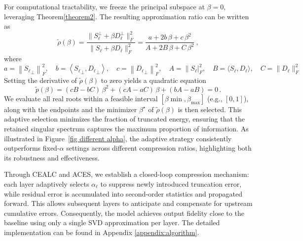 For computational tractability, we freeze the principal subspace at $\beta=0$, leveraging Theorem\ref{theorem2}. The resulting approximation ratio can be written as
\begin{equation}
    \widetilde\rho(\beta) = \frac{\|S_\ell^\perp + \beta D_\ell^\perp\|_F^2}{\|S_\ell + \beta D_\ell\|_F^2} = \frac{a + 2b\,\beta + c\,\beta^2}{A + 2B\,\beta + C\,\beta^2}~,
\end{equation}
where
\begin{equation}
a=\left\|{S_\ell}_{\perp}\right\|_F^2, \quad b=\left\langle {S_\ell}_{\perp}, {D_\ell}_{\perp}\right\rangle, \quad c=\left\|{D_\ell}_{\perp}\right\|_F^2, \quad A=\|{S_\ell}|_F^2, \quad B=\langle {S_\ell}, {D_\ell}\rangle, \quad C=\|{D_\ell}\|_F^2
\end{equation}
Setting the derivative of $\widetilde\rho(\beta)$ to zero yields a quadratic equation
\begin{equation}
    \widetilde{p}(\beta) = (cB - bC)\,\beta^2 + (cA - aC)\,\beta + (bA - aB) = 0\,.
    \label{eq: beta compute}
\end{equation}
We evaluate all real roots within a feasible interval $[\beta{\min},\beta_{\max}]$ (e.g., $[0,1]$), along with the endpoints and the minimizer $\beta^\star$ of $\widetilde\rho(\beta)$ is then selected. This adaptive selection minimizes the fraction of truncated energy, ensuring that the retained singular spectrum captures the maximum proportion of information. 
As illustrated in Figure~\ref{fig different alpha}, the adaptive strategy consistently outperforms fixed-$\alpha$ settings across different compression ratios, highlighting both its robustness and effectiveness. 

Through CEALC and ACES, we establish a closed-loop compression mechanism: each layer adaptively selects $\alpha_\ell$ to suppress newly introduced truncation error, while residual error is accumulated into second-order statistics and propagated forward. This allows subsequent layers to anticipate and compensate for upstream cumulative errors. Consequently, the model achieves output fidelity close to the baseline using only a single SVD approximation per layer. The detailed implementation can be found in Appendix \ref{appendix:algorithm}.